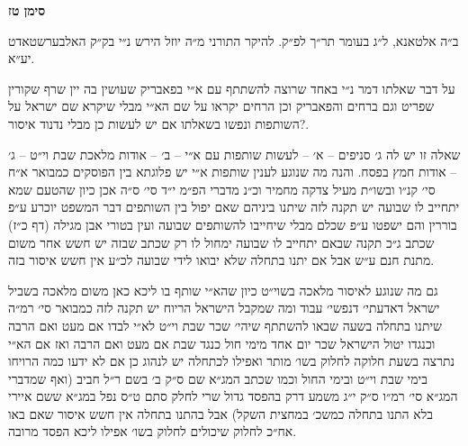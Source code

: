 \documentclass[12pt, openany]{book}
\newcommand{\chapname}{}
\newcommand{\newchap}[1]{
	\addcontentsline{toc}{chapter}{#1}
	\renewcommand{\chapname}{#1}
		\begin{center}
			\textbf{%
\fontsize{16pt}{16pt}\selectfont
				#1}
		\end{center}
}
\begin{document}
\newchap{סימן טז}
\begin{multicols}{2}
ב״ה אלטאנא, ל״ג בעומר תר״ך לפ״ק. להיקר התורני מ״ה יוזל הירש נ״י בק״ק האלבערשטאדט יע״א.\\\vspace{0pt}

על דבר שאלתו דמר נ״י באחד שרוצה להשתתף עם א״י בפאבריק שעושין בה יין שרף שקורין שפריט וגם ברחים והפאבריק וכן הרחים יקראו על שם הא״י מבלי שיקרא שם ישראל על השותפות ונפשו בשאלתו אם יש לעשות כן מבלי נדנוד איסור?.\\\vspace{0pt}

שאלה זו יש לה ג׳ סניפים – א׳ – לעשות שותפות עם א״י – ב׳ – אודות מלאכת שבת וי״ט – ג׳ – אודות חמץ בפסח. והנה מה שנוגע לענין שותפות א״י יש פלוגתא בין הפוסקים כמבואר א״ח סי׳ קנ״ו ובשו״ת מעיל צדקה מחמיר וכ״נ מדברי הפ״מ י״ד סי׳ ס״ה אכן כיון שהטעם שמא יתחייב לו שבועה יש תקנה לזה שיתנו ביניהם שאם יפול בין השותפים דבר המשפט יוכרע ע״פ בוררין והם ישפטו ע״פ שכלם מבלי שיחייבו להשותפים שבועה ועין בטורי אבן מגילה (דף כ״ז) שכתב ג״כ תקנה שבאם יתחייב לו שבועה ימחול לו רק שכתב שבזה יש חשש אחר משום מתנת חנם ע״ש אבל אם יתנו בתחלה שלא יבואו לידי שבועה לכ״ע אין חשש איסור בזה.\\\vspace{0pt}

גם מה שנוגע לאיסור מלאכה בשוי״ט כיון שהא״י שותף בו ליכא כאן משום מלאכה בשביל ישראל דאדעתי׳ דנפשי׳ עבוד ומה שמקבל הישראל הריוח יש תקנה לזה כמבואר סי׳ רמ״ה שיתנו בתחלה בשעה שבאו להשתתף שיהי׳ שכר שבת וי״ט לא״י לבדו אם מעט ואם הרבה וכנגדו יטול הישראל שכר יום אחד מימי חול כנגד שבת אם מעט ואם הרבה ואז אם הא״י נתרצה בשעת חלוקה לחלוק בשו׳ מותר ואפילו לכתחלה יש לנהוג כן אם לא ידעו כמה הרויחו בימי שבת וי״ט ובימי החול וכמו שכתב המג״א שם ס״ק ב׳ בשם ר״ל חביב (ואף שמדברי המג״א סי׳ רמ״ו ס״ק י״ג משמע דרק בהפסד גדול שרי לחלק סתם ט״ס נפל במג״א ששם איירי בלא התנו בתחלה כמשכ׳ במחצית השקל) אבל בהתנו בתחלה אין חשש איסור שאם באו אח״כ לחלוק שיכולים לחלוק בשו׳ אפילו ליכא הפסד מרובה.\\\vspace{0pt}


\end{multicols}
\end{document}
